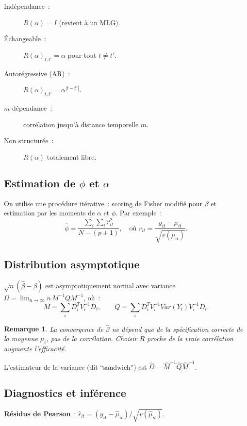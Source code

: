 \documentclass[11pt,letterpaper]{article}
\newtheorem{remarque}{Remarque}[section]
\begin{document}
\begin{description}
\item[Indépendance~:] $R(\alpha) = I$ (revient à un MLG).
\item[Échangeable~:] $R(\alpha)_{t,t'} = \alpha$ pour tout $t \neq t'$.
\item[Autorégressive (AR)~:] $R(\alpha)_{t,t'} = \alpha^{|t-t'|}$.
\item[$m$-dépendance~:] corrélation jusqu'à distance temporelle $m$.
\item[Non structurée~:] $R(\alpha)$ totalement libre.
\end{description}

\subsection{Estimation de $\phi$ et $\alpha$}

On utilise une procédure itérative~: scoring de Fisher modifié pour $\beta$ et estimation par les moments de $\alpha$ et $\phi$. Par exemple~:
$$\hat{\phi} = \frac{\sum_i \sum_t \hat{r}_{it}^2}{N - (p+1)}, \quad \text{où } r_{it} = \frac{y_{it} - \mu_{it}}{\sqrt{v(\mu_{it})}}.$$

\subsection{Distribution asymptotique}

$\sqrt{n}(\hat{\beta} - \beta)$ est asymptotiquement normal avec variance $\Omega = \lim_{n\to\infty} n\,M^{-1}QM^{-1}$, où~:
$$M = \sum_i D_i^T V_i^{-1} D_i, \qquad Q = \sum_i D_i^T V_i^{-1} Var(Y_i) V_i^{-1} D_i.$$

\begin{remarque}
La convergence de $\hat{\beta}$ ne dépend que de la spécification correcte de la moyenne $\mu_i$, pas de la corrélation. Choisir $R$ proche de la vraie corrélation augmente l'efficacité.
\end{remarque}

L'estimateur de la variance (dit ``sandwich'') est $\hat{\Omega} = \hat{M}^{-1}\hat{Q}\hat{M}^{-1}$.

\subsection{Diagnostics et inférence}

\textbf{Résidus de Pearson}~: $\hat{r}_{it} = (y_{it} - \hat{\mu}_{it})/\sqrt{v(\hat{\mu}_{it})}$.
\end{document}
